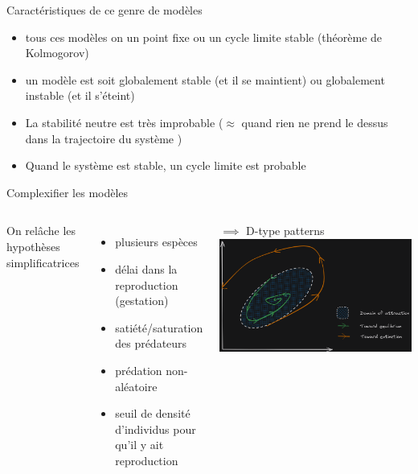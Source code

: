 \documentclass[11,aspectratio=1610]{beamer}
\begin{document}
\begin{frame}{Caractéristiques de ce genre de modèles}

\begin{itemize}
\item tous ces modèles on un point fixe ou un cycle limite stable  (théorème de Kolmogorov)
\item un modèle est soit globalement stable (et il se maintient) ou globalement instable (et il s'éteint)  
\item La stabilité neutre est très improbable ($\approx$ quand rien ne prend le dessus dans la trajectoire du système ) 
\item Quand le système est  stable, un cycle limite est probable 
\end{itemize}

\end{frame}




\begin{frame}{Complexifier les modèles}



\begin{footnotesize}

 \begin{columns}
             On relâche les hypothèses simplificatrices

\vspace{0.2cm}
\begin{itemize}
  \item plusieurs espèces 
\item  délai dans la reproduction (gestation) 
\item  satiété/saturation des prédateurs 
\item  prédation non-aléatoire
\item  seuil de densité d'individus pour qu'il y ait reproduction
\end{itemize}


$\implies$ D-type patterns \\
\vspace{1cm}
\includegraphics[width=\textwidth]{img/type2D.png}
\vfill
\end{columns}

\end{footnotesize}

\end{frame}
\end{document}
